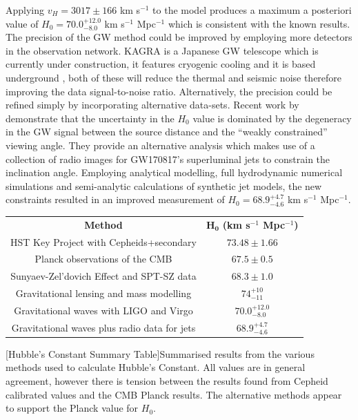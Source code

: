 \documentclass[12pt, onecolumn]{revtex4}    %
\begin{document}
Applying $v_H=3017\pm166$ km s$^{-1}$ to the model produces a maximum a posteriori value of $H_0=70.0^{+12.0}_{-8.0}$ km s$^{-1}$ Mpc$^{-1}$ which is consistent with the known results. The precision of the GW method could be improved by employing more detectors in the observation network. KAGRA is a Japanese GW telescope which is currently under construction, it features cryogenic cooling and it is based underground \citep{1742-6596-610-1-012016}, both of these will reduce the thermal and seismic noise therefore improving the data signal-to-noise ratio. Alternatively, the precision could be refined simply by incorporating alternative data-sets. Recent work by \cite{2018arXiv180610596H} demonstrate that the uncertainty in the \cite{2017Natur.551...85A} $H_0$ value is dominated by the degeneracy in the GW signal between the source distance and the ``weakly constrained'' viewing angle. They provide an alternative analysis which makes use of a collection of radio images for GW170817's superluminal jets to constrain the inclination angle. Employing analytical modelling, full hydrodynamic numerical simulations and semi-analytic calculations of synthetic jet models, the new constraints resulted in an improved measurement of  $H_0=68.9^{+4.7}_{-4.6}$ km s$^{-1}$ Mpc$^{-1}$. \\

\begin{center}
\renewcommand{\arraystretch}{1.0}
\begin{tabular}{c@{\hskip 20pt}c} 
 \hline
 \textbf{Method} & $\boldsymbol{H_0}$ \textbf{(km s$^{-1}$ Mpc$^{-1}$)} \\ [0.5ex] 
 HST Key Project with Cepheids+secondary & $73.48\pm1.66$ \\
 Planck observations of the CMB & $67.5\pm0.5$\\
 Sunyaev-Zel'dovich Effect and SPT-SZ data & $68.3\pm1.0$ \\
 Gravitational lensing and mass modelling & $74^{+10}_{-11}$ \\
 Gravitational waves with LIGO and Virgo & $70.0^{+12.0}_{-8.0}$ \\
 Gravitational waves plus radio data for jets & $68.9^{+4.7}_{-4.6}$ \\
 \hline
\end{tabular}
[Hubble's Constant Summary Table]{Summarised results from the various methods used to calculate Hubble's Constant. All values are in general agreement, however there is tension between the results found from Cepheid calibrated values and the CMB Planck results. The alternative methods appear to support the Planck value for $H_0$.}
\label{table:spectral_classification}
\end{center}
\end{document}
